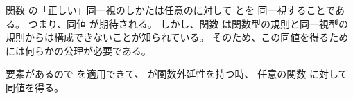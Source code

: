 \documentclass[index]{subfiles}
\begin{document}

関数
の「正しい」同一視のしかたは任意のに対して
とを
同一視することである。
つまり、同値
が期待される。
しかし、関数
は関数型の規則と同一視型の規則からは構成できないことが知られている。
そのため、この同値を得るためには何らかの公理が必要である。



要素があるので
を適用できて、
が関数外延性を持つ時、
任意の関数
に対して同値を得る。




\begin{mySubsections}
  
\end{mySubsections}
\end{document}
